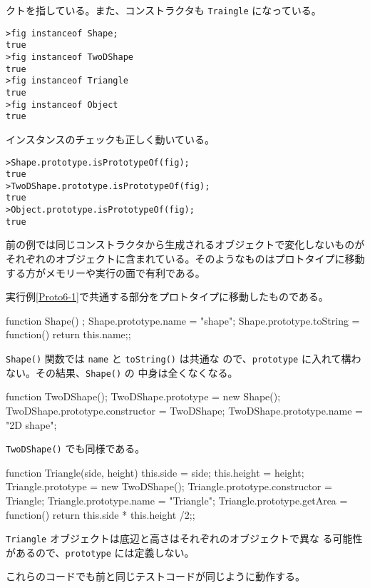 \begin{Exec}
 クトを指している。また、コンストラクタも \texttt{Traingle} になっている。
\begin{verbatim}
>fig instanceof Shape;
true
>fig instanceof TwoDShape
true
>fig instanceof Triangle
true
>fig instanceof Object
true
\end{verbatim}
インスタンスのチェックも正しく動いている。
\begin{verbatim}
>Shape.prototype.isPrototypeOf(fig);
true
>TwoDShape.prototype.isPrototypeOf(fig);
true
>Object.prototype.isPrototypeOf(fig);
true
\end{verbatim}
\iffalse
fig;
Triangle {name: "Triangle", side: 10, height: 5, getArea: function, constructor: function…}
>figProto=Object.getPrototypeOf(fig);
TwoDShape {name: "2D shape", constructor: function, toString: function}
\fi
\end{Exec}
前の例では同じコンストラクタから生成されるオブジェクトで変化しないものが
それぞれのオブジェクトに含まれている。そのようなものはプロトタイプに移動
する方がメモリーや実行の面で有利である。
\begin{Exec}\label{Proto6-2}\upshape
 実行例\ref{Proto6-1}で共通する部分をプロトタイプに移動したものである。
\begin{listing}{1}
function Shape() {};
Shape.prototype.name = "shape";
Shape.prototype.toString = function() {return this.name;};
\end{listing}
\texttt{Shape()} 関数では \texttt{name} と \texttt{toString()} は共通な
 ので、\texttt{prototype} に入れて構わない。その結果、\texttt{Shape()} の
 中身は全くなくなる。
\begin{listingcont}
function TwoDShape(){};
TwoDShape.prototype = new Shape();
TwoDShape.prototype.constructor = TwoDShape;
TwoDShape.prototype.name = "2D shape";
\end{listingcont}
\texttt{TwoDShape()} でも同様である。
\begin{listingcont}
function Triangle(side, height) {
  this.side = side;
  this.height = height;
}
Triangle.prototype = new TwoDShape();
Triangle.prototype.constructor = Triangle;
Triangle.prototype.name = "Triangle";
Triangle.prototype.getArea = function(){
    return this.side * this.height /2;};
\end{listingcont}
\texttt{Triangle} オブジェクトは底辺と高さはそれぞれのオブジェクトで異な
 る可能性があるので、\texttt{prototype} には定義しない。

これらのコードでも前と同じテストコードが同じように動作する。
\end{Exec}
